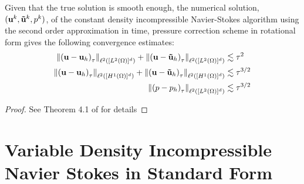 \documentclass[letterpaper]{erdc}
\begin{document}
\begin{theorem}
Given that the true solution is smooth enough, the numerical solution, $(\textbf{u}^k, \mathbf{\tilde{u}}^k, p^k)$, of the constant density incompressible Navier-Stokes algorithm using the second order approximation in time, pressure correction scheme in rotational form gives the following convergence estimates:
\begin{align*}
\left\| \left(\textbf{u} - \textbf{u}_h\right)_{\tau} \right\|_{\ell^2\left([L^2(\Omega)]^d \right)} + \left\| \left(\textbf{u} - \mathbf{\tilde{u}}_h\right)_{\tau} \right\|_{\ell^2\left([L^2(\Omega)]^d \right)} &\lesssim \tau^2\\
\left\| \left(\textbf{u} - \textbf{u}_h\right)_{\tau} \right\|_{\ell^2\left([H^1(\Omega)]^d \right)} + \left\| \left(\textbf{u} - \mathbf{\tilde{u}}_h\right)_{\tau} \right\|_{\ell^2\left([H^1(\Omega)]^d \right)}  &\lesssim \tau^{3/2}\\
 \left\| \left(p - p_h\right)_{\tau} \right\|_{\ell^2\left([L^2(\Omega)]^d \right)} &\lesssim \tau^{3/2}
\end{align*}

\end{theorem}
\begin{proof}
See Theorem 4.1 of \cite{guermond2004error} for details
\end{proof}


\section{Variable Density Incompressible Navier Stokes in Standard Form}
\end{document}
